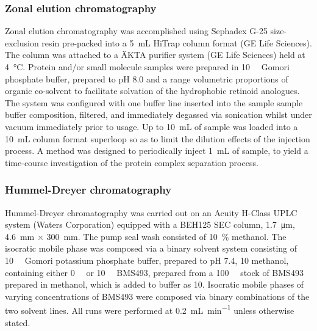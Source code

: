 \begin{refsection}


\subsubsection{Zonal elution chromatography}

Zonal elution chromatography was accomplished using Sephadex G-25 size-exclusion
resin pre-packed into a \SI{5}{\mL} HiTrap column format (GE Life Sciences). The
column was attached to a \"{A}KTA purifier system (GE Life Sciences) held at
\SI{4}{\celsius}. Protein and/or small molecule samples were prepared in
\SI{10}{\milli\moLar} Gomori phosphate buffer, prepared to pH 8.0 and a range
volumetric proportions of organic co-solvent to facilitate solvation of the
hydrophobic retinoid anologues. The system was configured with one buffer line
inserted into the sample sample buffer composition, filtered, and immediately
degassed via sonication whilst under vacuum immediately prior to usage. Up to
\SI{10}{\mL} of sample was loaded into a \SI{10}{\mL} column format superloop so
as to limit the dilution effects of the injection process. A method was designed
to periodically inject \SI{1}{\mL} of sample, to yield a time-course
investigation of the protein complex separation process.

\subsubsection{Hummel-Dreyer chromatography}

Hummel-Dreyer chromatography was carried out on an Acuity H-Class UPLC system
(Waters Corporation) equipped with a BEH125 SEC column, \SI{1.7}{\um},
\SI{4.6}{\mm} ${\times}$ \SI{300}{\mm}. The pump seal wash consisted of
\SI{10}{\percent} methanol. The isocratic mobile phase was composed via a binary
solvent system consisting of \SI{10}{\milli\moLar} Gomori potassium phosphate
buffer, prepared to pH 7.4, \SI{10}{\volper} methanol, containing either
\SI{0}{\micro\moLar} or \SI{10}{\micro\moLar} BMS493, prepared from a
\SI{100}{\micro\moLar} stock of BMS493 prepared in methanol, which is added to
buffer as \SI{10}{\volper}. Isocratic mobile phases of varying concentrations of
BMS493 were composed via binary combinations of the two solvent lines. All runs
were performed at \SI{0.2}{\mL\per\minute} unless otherwise stated.


\end{refsection}

